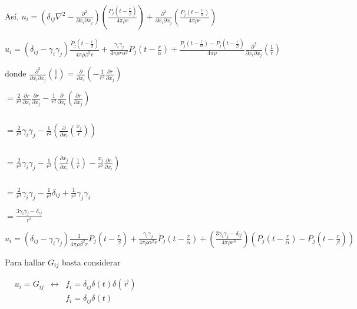 \documentclass[a4paper,12pt]{article}
\begin{document}
Así,
$u_i=\left(\delta_{ij}\nabla^2-\frac{\partial^2}{\partial x_i\partial x_j}\right)\left(\frac{P_j\left(t-\frac{r}{\beta}\right)}{4\pi\rho r}\right)+\frac{\partial^2}{\partial x_i\partial x_j}\left(\frac{P_j\left(t-\frac{r}{\alpha}\right)}{4\pi\rho r}\right)$

$u_i=(\delta_{ij}-\gamma_i\gamma_j)\frac{\ddot P_j \left(t-\frac{r}{\beta}\right)}{4\pi\rho\beta^2r} +\frac{\gamma_i\gamma_j}{4\pi\rho r\alpha^2}\ddot P_j\left(t-\frac{r}{\alpha}\right)+\frac{P_j\left(t-\frac{r}{\alpha}\right)-P_j\left(t-\frac{r}{\beta}\right)}{4\pi\rho}\frac{\partial^2}{\partial x_i\partial x_j}\left(\frac{1}{r}\right)$
\begin{center}


donde $\frac{\partial^2}{\partial x_i\partial
x_j}\left(\frac{1}{r}\right)=\frac{\partial}{\partial x_i}\left(-\frac{1}{r^2}\frac{\partial r}{\partial x_j}\right)$
\end{center}
$=\frac{2}{r^3}\frac{\partial r}{\partial x_i}\frac{\partial r}{\partial x_j}-\frac{1}{r^2}\frac{\partial}{\partial x_i}\left(\frac{\partial r}{\partial x_j}\right)$

$\quad$

$=\frac{2}{r^3}\gamma_i\gamma_j-\frac{1}{r^2}\left(\frac{\partial}{\partial x_i}\left(\frac{x_j}{r}\right)\right)$

$\quad$

$=\frac{2}{r^3}\gamma_i\gamma_j-\frac{1}{r^2}\left(\frac{\partial x_j}{\partial x_i}\left(\frac{1}{r}\right)-\frac{x_j}{r^2}\frac{\partial r}{\partial x_i}\right)$

$\quad$

$=\frac{2}{r^3}\gamma_i\gamma_j-\frac{1}{r^3}\delta_{ij}+\frac{1}{r^3}\gamma_j\gamma_i$

$=\frac{3\gamma_i\gamma_j-\delta_{ij}}{r^3}$

$u_i=(\delta_{ij}-\gamma_i\gamma_j)\frac{1}{4\pi\rho\beta^2r}\ddot{P}_j\left(t-\frac{r}{\beta}\right)+\frac{\gamma_i\gamma_j}{4\pi\rho\alpha^2 r}\ddot{P}_j\left(t-\frac{r}{\alpha}\right)+\left(\frac{3\gamma_i\gamma_j-\delta_{ij}}{4\pi\rho r^3}\right)\left(P_j\left(t-\frac{r}{\alpha}\right)-P_j\left(t-\frac{r}{\beta}\right)\right)$

Para hallar $G_{ij}$ basta considerar
\begin{center}
$
\begin{array}{ccrr}
&u_i=G_{ij}&\leftrightarrow& f_i=\delta_{ij}\delta (t)\delta (\vec r)\\
& & & f_i=\delta_{ij}\delta(t)
\end{array}
$
\end{center}
$\quad$
\end{document}
